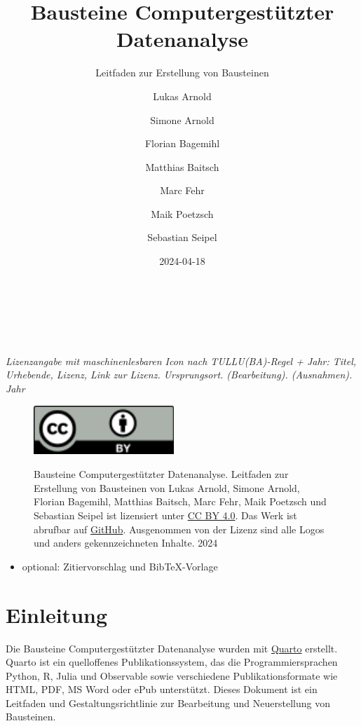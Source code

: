 \documentclass[
  letterpaper,
  DIV=11]{scrartcl}
\title{Bausteine Computergestützter Datenanalyse}
\subtitle{Leitfaden zur Erstellung von Bausteinen}
\author{Lukas Arnold \and Simone Arnold \and Florian
Bagemihl \and Matthias Baitsch \and Marc Fehr \and Maik
Poetzsch \and Sebastian Seipel}
\date{2024-04-18}
\providecommand{\tightlist}{%
  \setlength{\itemsep}{0pt}\setlength{\parskip}{0pt}}\usepackage{longtable,booktabs,array}
\renewcommand*\contentsname{Inhaltsverzeichnis}
\newcommand\contentsname{Inhaltsverzeichnis}
\begin{document}
\maketitle

\renewcommand*\contentsname{Inhaltsverzeichnis}
{
\hypersetup{linkcolor=}
\setcounter{tocdepth}{3}
\tableofcontents
}
~

~

\label{Lizenz}
\emph{Lizenzangabe mit maschinenlesbaren Icon nach TULLU(BA)-Regel +
Jahr: Titel, Urhebende, Lizenz, Link zur Lizenz. Ursprungsort.
(Bearbeitung). (Ausnahmen). Jahr}

\begin{figure}

\begin{minipage}{0.20\linewidth}
\includegraphics{grafiken/CC-BY.pdf} \end{minipage}%
%
\begin{minipage}{0.80\linewidth}
Bausteine Computergestützter Datenanalyse. Leitfaden zur Erstellung von
Bausteinen von Lukas Arnold, Simone Arnold, Florian Bagemihl, Matthias
Baitsch, Marc Fehr, Maik Poetzsch und Sebastian Seipel ist lizensiert
unter \href{https://creativecommons.org/licenses/by/4.0/deed.de}{CC BY
4.0}. Das Werk ist abrufbar auf
\href{https://github.com/bausteine-der-datenanalyse/bcd-styleguide}{GitHub}.
Ausgenommen von der Lizenz sind alle Logos und anders gekennzeichneten
Inhalte. 2024\end{minipage}%

\end{figure}%

\begin{itemize}
\tightlist
\item
  optional: Zitiervorschlag und BibTeX-Vorlage
\end{itemize}

\newpage{}

\section{Einleitung}\label{einleitung}

Die Bausteine Computergestützter Datenanalyse wurden mit
\href{https://quarto.org/}{Quarto} erstellt. Quarto ist ein quelloffenes
Publikationssystem, das die Programmiersprachen Python, R, Julia und
Observable sowie verschiedene Publikationsformate wie HTML, PDF, MS Word
oder ePub unterstützt. Dieses Dokument ist ein Leitfaden und
Gestaltungsrichtlinie zur Bearbeitung und Neuerstellung von Bausteinen.
\end{document}
